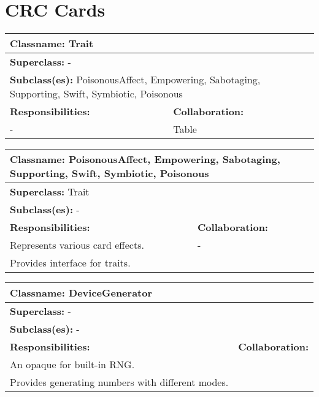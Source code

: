 
\section{CRC Cards} 
\begin{table}[H]
    \centering
    \begin{tabular}{|l|l|}
         \toprule
         \multicolumn{2}{|l|}{\textbf{Classname: }Trait} \\
         \midrule
         \multicolumn{2}{|l|}{\textbf{Superclass: }-} \\
         \multicolumn{2}{|l|}{\textbf{Subclass(es): }PoisonousAffect, Empowering, Sabotaging, Supporting, Swift, Symbiotic, Poisonous} \\
         \midrule
         \textbf{Responsibilities:} & \textbf{Collaboration:} \\
         - & Table  \\ 
         \bottomrule
    \end{tabular}
    \label{tab:my_label}
\end{table}

\begin{table}[H]
    \centering
    \begin{tabular}{|l|l|}
         \toprule
         \multicolumn{2}{|l|}{\textbf{Classname: }PoisonousAffect, Empowering, Sabotaging, Supporting, Swift, Symbiotic, Poisonous} \\
         \midrule
         \multicolumn{2}{|l|}{\textbf{Superclass: }Trait} \\
         \multicolumn{2}{|l|}{\textbf{Subclass(es): }-} \\
         \midrule
         \textbf{Responsibilities:} & \textbf{Collaboration:} \\
         Represents various card effects. & - \\
         Provides interface for traits. & \\
         \bottomrule
    \end{tabular}
    \label{tab:my_label}
\end{table}

\begin{table}[H]
    \centering
    \begin{tabular}{|l|l|}
         \toprule
         \multicolumn{2}{|l|}{\textbf{Classname: }DeviceGenerator} \\
         \midrule
         \multicolumn{2}{|l|}{\textbf{Superclass: }-} \\
         \multicolumn{2}{|l|}{\textbf{Subclass(es): }-} \\
         \midrule
         \textbf{Responsibilities:} & \textbf{Collaboration:} \\
         An opaque for built-in RNG.&  \\ 
         Provides generating numbers with different modes. &  \\ 
         \bottomrule
    \end{tabular}
    \label{tab:my_label}
\end{table}


